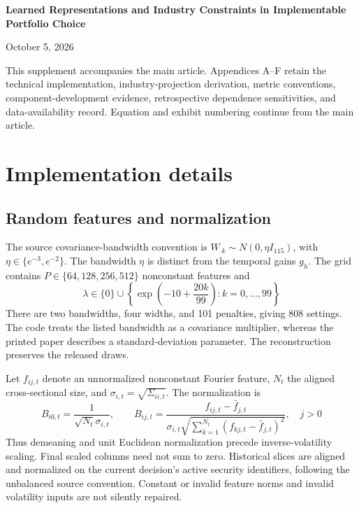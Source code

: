 \documentclass[12pt,letterpaper,fleqn]{article}
\newcounter{exhibit}
\newcommand{\papertitle}{Learned Representations and Industry Constraints in Implementable Portfolio Choice}
\newcommand{\paperdate}{October 5, 2026}
\newcommand{\printtitle}{\begingroup\setlength{\parindent}{0pt}\raggedright
{\fontsize{18}{22}\selectfont\bfseries\papertitle\par}\endgroup}
\begin{document}
\par
\printtitle
\noindent\paperdate

\noindent This supplement accompanies the main article. Appendices A--F retain the technical implementation, industry-projection derivation, metric conventions, component-development evidence, retrospective dependence sensitivities, and data-availability record. Equation and exhibit numbering continue from the main article.
\setcounter{equation}{16}
\setcounter{exhibit}{6}
\appendix

\section{Implementation details}\label{app:implementation}
\subsection{Random features and normalization}
The source covariance-bandwidth convention is $W_{\cdot k}\sim N(0,\eta I_{115})$, with $\eta\in\{e^{-3},e^{-2}\}$. The bandwidth $\eta$ is distinct from the temporal gains $g_h$. The grid contains $P\in\{64,128,256,512\}$ nonconstant features and
\begin{equation}
 \lambda\in\{0\}\cup\left\{\exp\left(-10+\frac{20k}{99}\right):k=0,\ldots,99\right\}
\end{equation}
There are two bandwidths, four widths, and 101 penalties, giving 808 settings. The code treats the listed bandwidth as a covariance multiplier, whereas the printed paper describes a standard-deviation parameter. The reconstruction preserves the released draws.

Let $f_{ij,t}$ denote an unnormalized nonconstant Fourier feature, $N_t$ the aligned cross-sectional size, and $\sigma_{i,t}=\sqrt{\Sigma_{ii,t}}$. The normalization is
\begin{equation}\label{eq:normalize}
 B_{i0,t}=\frac{1}{\sqrt{N_t}\sigma_{i,t}},\qquad
 B_{ij,t}=\frac{f_{ij,t}-\bar f_{j,t}}
 {\sigma_{i,t}\sqrt{\sum_{k=1}^{N_t}(f_{kj,t}-\bar f_{j,t})^2}},\quad j>0
\end{equation}
Thus demeaning and unit Euclidean normalization precede inverse-volatility scaling. Final scaled columns need not sum to zero. Historical slices are aligned and normalized on the current decision's active security identifiers, following the unbalanced source convention. Constant or invalid feature norms and invalid volatility inputs are not silently repaired.
\end{document}
